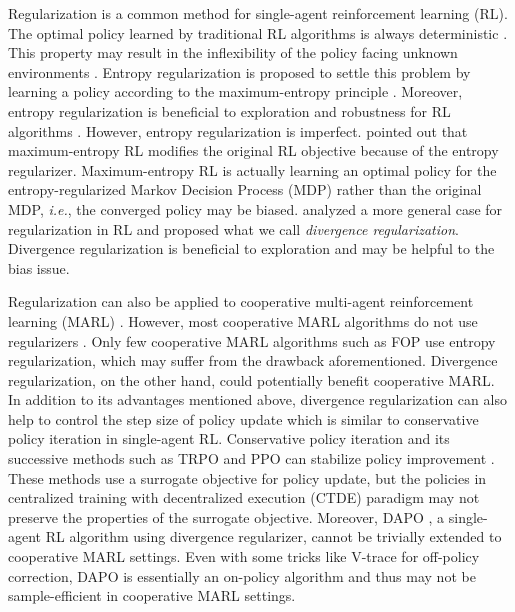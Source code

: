\documentclass{article}
\begin{document}
Regularization is a common method for single-agent reinforcement learning (RL). The optimal policy learned by traditional RL algorithms is always deterministic \citep{RLBOOK}. This property may result in the inflexibility of the policy facing unknown environments \citep{regularizer}. Entropy regularization is proposed to settle this problem by learning a policy according to the maximum-entropy principle \citep{deep_energy}. Moreover, entropy regularization is beneficial to exploration and robustness for RL algorithms \citep{SAC}. However, entropy regularization is imperfect. \citet{whatisquestion} pointed out that maximum-entropy RL modifies the original RL objective because of the entropy regularizer. Maximum-entropy RL is actually learning an optimal policy for the entropy-regularized Markov Decision Process (MDP) rather than the original MDP, \textit{i.e.}, the converged policy may be biased. \citet{SAC-theory} analyzed a more general case for regularization in RL and proposed what we call \textit{divergence regularization}. Divergence regularization is beneficial to exploration and may be helpful to the bias issue. 

Regularization can also be applied to cooperative multi-agent reinforcement learning (MARL) \citep{transfer,FOP}. However, most cooperative MARL algorithms do not use regularizers \citep{MADDPG,COMA,QMIX,QTRAN,DGN,QPLEX}. Only few cooperative MARL algorithms such as FOP \citep{FOP} use entropy regularization, which may suffer from the drawback aforementioned. Divergence regularization, on the other hand, could potentially benefit cooperative MARL. In addition to its advantages mentioned above, divergence regularization can also help to control the step size of policy update which is similar to conservative policy iteration \citep{CPI} in single-agent RL. Conservative policy iteration and its successive methods such as TRPO \citep{TRPO} and PPO \citep{PPO} can stabilize policy improvement \citep{stable-policy}. These methods use a surrogate objective for policy update, but the policies in centralized training with decentralized execution (CTDE) paradigm may not preserve the properties of the surrogate objective. Moreover, DAPO \citep{DIV-AUG}, a single-agent RL algorithm using divergence regularizer,  cannot be trivially extended to cooperative MARL settings. Even with some tricks like V-trace \citep{V-trace} for off-policy correction, DAPO is essentially an on-policy algorithm and thus may not be sample-efficient in cooperative MARL settings. 
\end{document}
